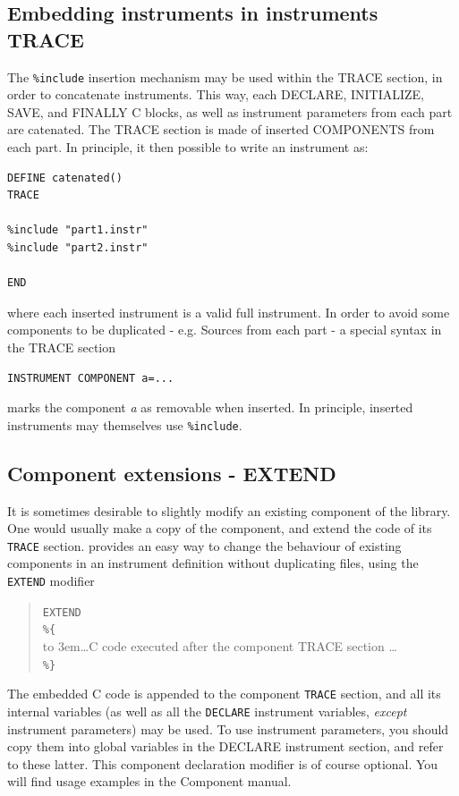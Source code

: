 \subsection{Embedding instruments in instruments TRACE}
\label{s:instrdefs-include-instr}
The \texttt{\%include} insertion mechanism may be used within the TRACE section, in order to concatenate instruments. This way, each DECLARE, INITIALIZE, SAVE, and FINALLY C
 blocks, as well as instrument parameters from each part are catenated. The TRACE section is made of inserted COMPONENTS from each part. In principle, it then possible to write an
 instrument as:
\begin{verbatim}
DEFINE catenated()
TRACE

%include "part1.instr"
%include "part2.instr"

END
\end{verbatim}
where each inserted instrument is a valid full instrument. In order to avoid some components to be duplicated - e.g. Sources from each part - a special syntax in the TRACE section
\begin{verbatim}
INSTRUMENT COMPONENT a=...
\end{verbatim}
marks the component \textit{a} as removable when inserted. In principle, inserted instruments may themselves use \texttt{\%include}.

\subsection{Component extensions - EXTEND}
\label{s:instrdefs-extend}

It is sometimes desirable to slightly modify an existing component of the \MCX library. One would usually make a copy of the component, and extend the code of its \texttt{TRACE}
section. \MCX provides an easy way to change the behaviour of existing components in an instrument definition without duplicating files, using the \texttt{EXTEND} modifier
\begin{quote}
  \texttt{EXTEND} \\
  \verb|%{| \\
  \hbox to 3em{}\ldots C code executed after the component TRACE section \ldots \\
  \verb|%}|
\end{quote} 
The embedded C code is appended to the component \texttt{TRACE} section, and all its internal variables (as well as all the \texttt{DECLARE} instrument variables, \emph{except} instrument parameters) may be used. To use instrument parameters, you should copy them into global variables in the DECLARE instrument section, and refer to these latter.
This component declaration modifier is of course optional. You will find usage examples in the Component manual\cite{mcxtrace-comp-manual}.

